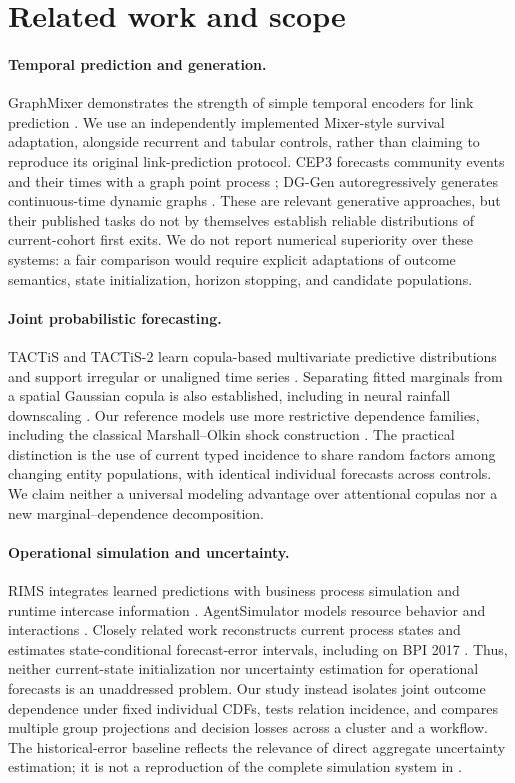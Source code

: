 \section{Related work and scope}
\paragraph{Temporal prediction and generation.}
GraphMixer demonstrates the strength of simple temporal encoders for link
prediction \citep{cong2023}. We use an independently implemented Mixer-style
survival adaptation, alongside recurrent and tabular controls, rather than
claiming to reproduce its original link-prediction protocol. CEP3 forecasts
community events and their times with a graph point process \citep{wang2022};
DG-Gen autoregressively generates continuous-time dynamic graphs
\citep{hosseini2025}. These are relevant generative approaches, but their
published tasks do not by themselves establish reliable distributions of
current-cohort first exits. We do not report numerical superiority over these
systems: a fair comparison would require explicit adaptations of outcome
semantics, state initialization, horizon stopping, and candidate populations.

\paragraph{Joint probabilistic forecasting.}
TACTiS and TACTiS-2 learn copula-based multivariate predictive distributions and
support irregular or unaligned time series \citep{drouin2022,ashok2024}.
Separating fitted marginals from a spatial Gaussian copula is also established,
including in neural rainfall downscaling \citep{huk2025}. Our reference models
use more restrictive dependence families, including the classical
Marshall--Olkin shock construction \citep{marshall1967}. The practical
distinction is the use of current typed incidence to share random factors among
changing entity populations, with identical individual forecasts across
controls. We claim neither a universal modeling advantage over attentional
copulas nor a new marginal--dependence decomposition.

\paragraph{Operational simulation and uncertainty.}
RIMS integrates learned predictions with business process simulation and
runtime intercase information \citep{meneghello2025}. AgentSimulator models
resource behavior and interactions \citep{kirchdorfer2025}. Closely related
work reconstructs current process states and estimates state-conditional
forecast-error intervals, including on BPI 2017 \citep{avramenko2026}.
Thus, neither current-state initialization nor uncertainty estimation for
operational forecasts is an unaddressed problem. Our study instead isolates
joint outcome dependence under fixed individual CDFs, tests relation incidence,
and compares multiple group projections and decision losses across a cluster
and a workflow. The historical-error baseline reflects the relevance of direct
aggregate uncertainty estimation; it is not a reproduction of the complete
simulation system in \citet{avramenko2026}.

